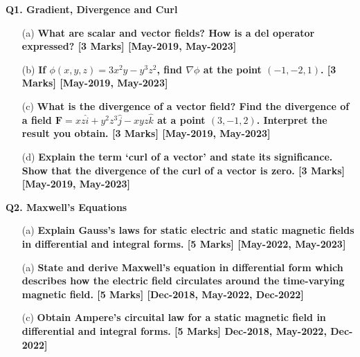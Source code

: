 \documentclass{exam}
\begin{document}
\textbf{\Large Q1. Gradient, Divergence and Curl}

\begin{enumerate}

\item[(a)]  \textbf{What are scalar and vector fields? How is a del operator expressed?   \hfil [3 Marks] [May-2019, May-2023] }

\item[(b)] \textbf{ If $\phi(x,y,z) = 3x^2y - y^3z^2$, find $\nabla \phi$ at the point $(-1, -2, 1)$.  \hfil [3 Marks] [May-2019, May-2023] }

\item[(c)] \textbf{ What is the divergence of a vector field? Find the divergence of a field $\mathbf{F} = xz \hat{i} + y^2 z^3 \hat{j} - xyz \hat{k}$ at a point $(3, -1, 2)$. Interpret the result you obtain.  \hfil [3 Marks] [May-2019, May-2023] }

\item[(d)] \textbf{ Explain the term ‘curl of a vector’ and state its significance. Show that the divergence of the curl of a vector is zero.    \hfil [3 Marks] [May-2019, May-2023] }

\end{enumerate}


\textbf{\Large Q2. Maxwell's Equations}

\begin{enumerate}
\item[(a)] \textbf{ Explain Gauss’s laws for static electric and static magnetic fields in differential and integral forms. \hfil [5 Marks] [May-2022, May-2023] }
		
\item[(a)] \textbf{ State and derive Maxwell’s equation in differential form which describes how the electric field circulates around the time-varying magnetic field. \hfil [5 Marks] [Dec-2018, May-2022, Dec-2022] }

\item[(c)] \textbf{Obtain Ampere’s circuital law for a static magnetic field in differential and integral forms.  \hfil [5 Marks] Dec-2018, May-2022, Dec-2022] }
\end{enumerate}
\vspace{0.5cm}


\vspace{0.1cm}
\noindent

	
\end{document}
